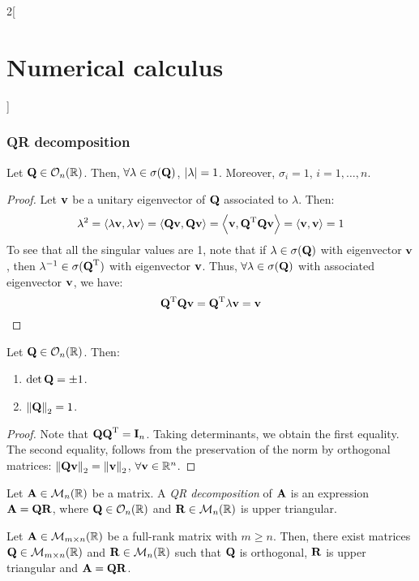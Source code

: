 \documentclass[../../../main_math.tex]{subfiles}
\begin{document}
\begin{multicols}{2}[\section{Numerical calculus}]
  \subsubsection{QR decomposition}
  \begin{lemma}\label{NC:eigenvalues_orto}
    Let $\vf{Q}\in\mathcal{O}_n(\RR)$. Then, $\forall\lambda\in\sigma(\vf{Q})$, $\abs{\lambda}=1$. Moreover, $\sigma_i = 1$, $i=1, \ldots, n$.
  \end{lemma}
  \begin{proof}
    Let $\vf{v}$ be a unitary eigenvector of $\vf{Q}$ associated to $\lambda$. Then:
    $$\lambda^2 = \dotp{\lambda \vf{v}}{\lambda \vf{v}} = \dotp{\vf{Q}\vf{v}}{\vf{Q}\vf{v}} = \dotp{\vf{v}}{\transpose{\vf{Q}}\vf{Q}\vf{v}} = \dotp{\vf{v}}{\vf{v}} = 1$$
    To see that all the singular values are 1, note that if $\lambda\in\sigma(\vf{Q})$ with eigenvector $\vf{v}$, then $\lambda^{-1}\in \sigma(\transpose{\vf{Q}})$ with eigenvector $\vf{v}$. Thus, $\forall\lambda\in\sigma(\vf{Q})$ with associated eigenvector $\vf{v}$, we have:
    $$
      \transpose{\vf{Q}}\vf{Qv}=\transpose{\vf{Q}}\lambda \vf{v} = \vf{v}
    $$
  \end{proof}
  \begin{lemma}
    Let $\vf{Q}\in\mathcal{O}_n(\RR)$. Then:
    \begin{enumerate}
      \item $\det\vf{Q}=\pm 1$.
      \item $\norm{\vf{Q}}_2=1$.
    \end{enumerate}
  \end{lemma}
  \begin{proof}
    Note that $\vf{Q} \transpose{\vf{Q}}=\vf{I}_n$. Taking determinants, we obtain the first equality. The second equality, follows from the preservation of the norm by orthogonal matrices: $\norm{\vf{Q}\vf{v}}_2 = \norm{\vf{v}}_2$, $\forall\vf{v}\in\RR^n$.
  \end{proof}
  \begin{definition}[QR descompostion]
    Let $\vf{A}\in\mathcal{M}_{n}(\RR)$ be a matrix. A \emph{QR decomposition} of $\vf{A}$ is an expression $\vf{A}=\vf{Q}\vf{R}$, where $\vf{Q}\in\mathcal{O}_n(\RR)$ and $\vf{R}\in\mathcal{M}_{n}(\RR)$ is upper triangular.
  \end{definition}
  \begin{proposition}
    Let $\vf{A}\in\mathcal{M}_{m\times n}(\RR)$ be a full-rank matrix with $m\geq n$. Then, there exist matrices $\vf{Q}\in\mathcal{M}_{m\times n}(\RR)$ and $\vf{R}\in\mathcal{M}_{n}(\RR)$ such that $\vf{Q}$ is orthogonal, $\vf{R}$ is upper triangular and $\vf{A}=\vf{Q}\vf{R}$.

\end{proposition}
\end{multicols}
\end{document}
